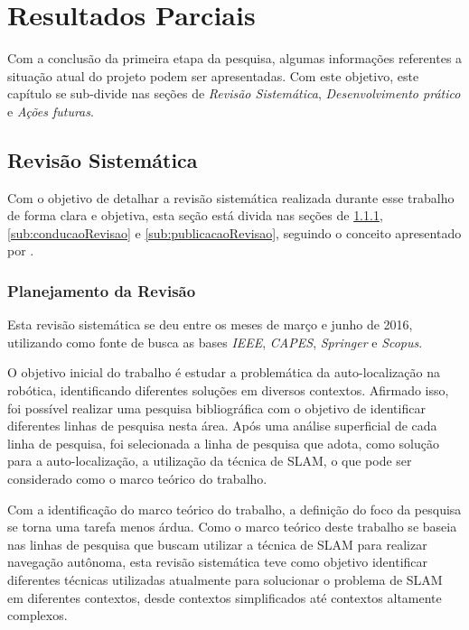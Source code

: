 \chapter[Resultados Parciais]{Resultados Parciais}
\label{sec:resultados_parciais}

Com a conclusão da primeira etapa da pesquisa, algumas informações referentes a situação atual do projeto podem ser apresentadas. Com este objetivo, este capítulo se sub-divide nas seções de \textit{Revisão Sistemática}, \textit{Desenvolvimento prático} e \textit{Ações futuras}.

\section{Revisão Sistemática} %
\label{sec:revisão_sistemática}

	Com o objetivo de detalhar a revisão sistemática realizada durante esse trabalho de forma clara e objetiva, esta seção está divida nas seções de \ref{sub:planejamentoRevisao}, \ref{sub:conducaoRevisao} e \ref{sub:publicacaoRevisao}, seguindo o conceito apresentado por \cite{Kitchenham}.

	\subsection{Planejamento da Revisão} %
	\label{sub:planejamentoRevisao}

		Esta revisão sistemática se deu entre os meses de março e junho de 2016, utilizando como fonte de busca as bases \textit{IEEE}, \textit{CAPES}, \textit{Springer} e \textit{Scopus}.
		
		O objetivo inicial do trabalho é estudar a problemática da auto-localização na robótica, identificando diferentes soluções em diversos contextos. Afirmado isso, foi possível realizar uma pesquisa bibliográfica com o objetivo de identificar diferentes linhas de pesquisa nesta área. Após uma análise superficial de cada linha de pesquisa, foi selecionada a linha de pesquisa que adota, como solução para a auto-localização, a utilização da técnica de SLAM, o que pode ser considerado como o marco teórico do trabalho. 

		Com a identificação do marco teórico do trabalho, a definição do foco da pesquisa se torna uma tarefa menos árdua. Como o marco teórico deste trabalho se baseia nas linhas de pesquisa que buscam utilizar a técnica de SLAM para realizar navegação autônoma, esta revisão sistemática teve como objetivo identificar diferentes técnicas utilizadas atualmente para solucionar o problema de SLAM em diferentes contextos, desde contextos simplificados até contextos altamente complexos.

